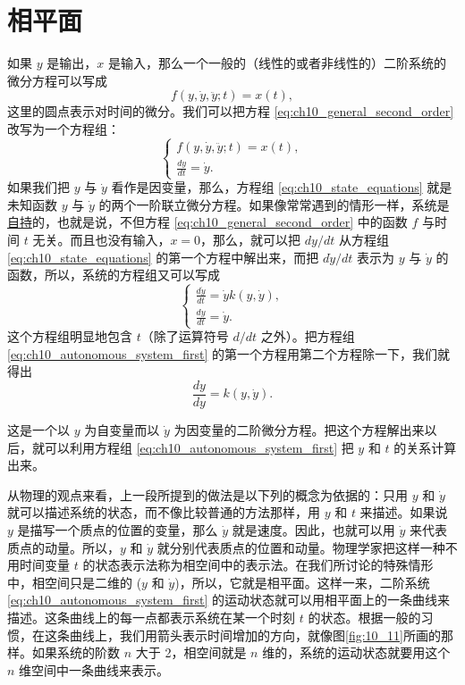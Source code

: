 \section{相平面}\label{chapter10_section5}

如果 $y$ 是输出，$x$ 是输入，那么一个一般的（线性的或者非线性的）二阶系统的微分方程可以写成
\begin{equation}\label{eq:ch10_general_second_order}
f(y, \dot{y}, \ddot{y}; t) = x(t),
\end{equation}
这里的圆点表示对时间的微分。我们可以把方程 \eqref{eq:ch10_general_second_order} 改写为一个方程组：
\begin{equation}\label{eq:ch10_state_equations}
\begin{cases} 
f(y, \dot{y}, \ddot{y}; t) = x(t), \\ 
\frac{dy}{dt} = \dot{y}. 
\end{cases}
\end{equation}
如果我们把 $y$ 与 $\dot{y}$ 看作是因变量，那么，方程组 \eqref{eq:ch10_state_equations} 就是未知函数 $y$ 与 $\dot{y}$ 的两个一阶联立微分方程。如果像常常遇到的情形一样，系统是\underline{自持}的，也就是说，不但方程 \eqref{eq:ch10_general_second_order} 中的函数 $f$ 与时间 $t$ 无关。而且也没有输入，$x = 0$，那么，就可以把 $dy/dt$ 从方程组 \eqref{eq:ch10_state_equations} 的第一个方程中解出来，而把 $d\dot{y}/dt$ 表示为 $y$ 与 $\dot{y}$ 的函数，所以，系统的方程组又可以写成
\begin{equation}\label{eq:ch10_autonomous_system_first}
\begin{cases}
\frac{d\dot{y}}{dt} = \dot{y}k(y, \dot{y}),\\
\frac{dy}{dt} = \dot{y}.
\end{cases}
\end{equation}
这个方程组明显地包含 $t$（除了运算符号 $d/dt$ 之外）。把方程组 \eqref{eq:ch10_autonomous_system_first} 的第一个方程用第二个方程除一下，我们就得出
\begin{equation}\label{eq:ch10_trajectory_equation}
\frac{dy}{dy} = k(y, \dot{y}).
\end{equation}

这是一个以 $y$ 为自变量而以 $\dot{y}$ 为因变量的二阶微分方程。把这个方程解出来以后，就可以利用方程组 \eqref{eq:ch10_autonomous_system_first} 把 $y$ 和 $t$ 的关系计算出来。

从物理的观点来看，上一段所提到的做法是以下列的概念为依据的：只用 $y$ 和 $\dot{y}$ 就可以描述系统的状态，而不像比较普通的方法那样，用 $y$ 和 $t$ 来描述。如果说 $y$ 是描写一个质点的位置的变量，那么 $\dot{y}$ 就是速度。因此，也就可以用 $\dot{y}$ 来代表质点的动量。所以，$y$ 和 $\dot{y}$ 就分别代表质点的位置和动量。物理学家把这样一种不用时间变量 $t$ 的状态表示法称为相空间中的表示法。在我们所讨论的特殊情形中，相空间只是二维的 ($y$ 和 $\dot{y}$)，所以，它就是相平面。这样一来，二阶系统 \eqref{eq:ch10_autonomous_system_first} 的运动状态就可以用相平面上的一条曲线来描述。这条曲线上的每一点都表示系统在某一个时刻 $t$ 的状态。根据一般的习惯，在这条曲线上，我们用箭头表示时间增加的方向，就像图\ref{fig:10_11}所画的那样。如果系统的阶数 $n$ 大于 2，相空间就是 $n$ 维的，系统的运动状态就要用这个 $n$ 维空间中一条曲线来表示。

